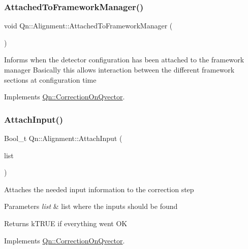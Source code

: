\subsubsection{\texorpdfstring{Attached\+To\+Framework\+Manager()}{AttachedToFrameworkManager()}}
{\footnotesize\ttfamily void Qn\+::\+Alignment\+::\+Attached\+To\+Framework\+Manager (\begin{DoxyParamCaption}{ }\end{DoxyParamCaption})\hspace{0.3cm}{\ttfamily [virtual]}}

Informs when the detector configuration has been attached to the framework manager Basically this allows interaction between the different framework sections at configuration time 

Implements \mbox{\hyperlink{classQn_1_1CorrectionOnQvector_ad2d37eb35973c854c7ffa3560a97d510}{Qn\+::\+Correction\+On\+Qvector}}.

\mbox{\label{classQn_1_1Alignment_a3ae85e6706fe2a04098d339fcfff9113}} 
\subsubsection{\texorpdfstring{Attach\+Input()}{AttachInput()}}
{\footnotesize\ttfamily Bool\+\_\+t Qn\+::\+Alignment\+::\+Attach\+Input (\begin{DoxyParamCaption}\item[{T\+List $\ast$}]{list }\end{DoxyParamCaption})\hspace{0.3cm}{\ttfamily [virtual]}}

Attaches the needed input information to the correction step 
\begin{DoxyParams}{Parameters}
{\em list} & list where the inputs should be found \\
\hline
\end{DoxyParams}
\begin{DoxyReturn}{Returns}
k\+T\+R\+UE if everything went OK 
\end{DoxyReturn}


Implements \mbox{\hyperlink{classQn_1_1CorrectionOnQvector_acb7165c2eb071517fa977484bee7e445}{Qn\+::\+Correction\+On\+Qvector}}.

\mbox{\label{classQn_1_1Alignment_ac11ae0ae7f1ea1e1b8408d73469d54d1}} 
